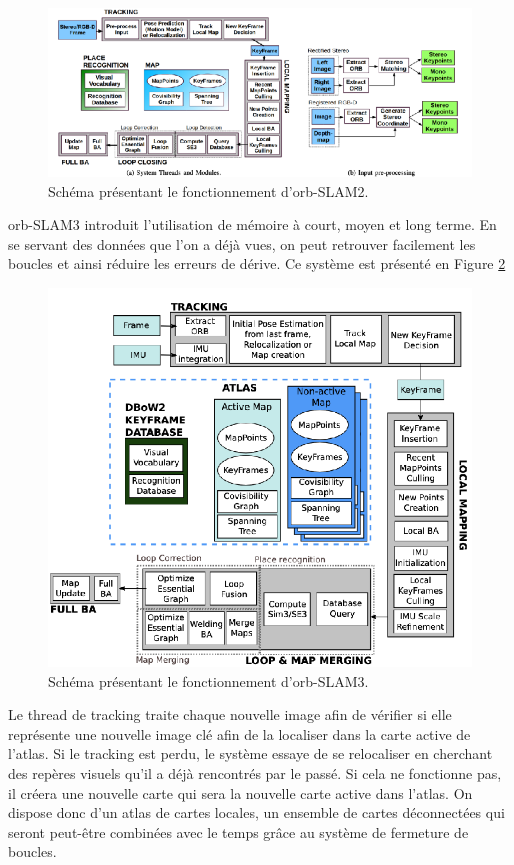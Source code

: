 \documentclass[11pt]{article}
\begin{document}
  \begin{figure}[hbt]  
    \includegraphics[width=\textwidth]{ORB_SLAM2.png}    
    \caption{Schéma présentant le fonctionnement d'\acrshort{orb}-SLAM2.}
    \label{fig:ORBSLAM2}
  \end{figure} 

  \acrshort{orb}-SLAM3 introduit l'utilisation de mémoire à court, moyen et long terme. En se servant des données que l'on a déjà vues, on peut retrouver
  facilement les boucles et ainsi réduire les erreurs de dérive. Ce système est présenté en Figure \ref{fig:ORBSLAM3}

  \begin{figure}[hbt]  
    \includegraphics[width=\textwidth]{ORB_SLAM3.png}    
    \caption{Schéma présentant le fonctionnement d'\acrshort{orb}-SLAM3.}
    \label{fig:ORBSLAM3}
  \end{figure} 

  Le thread de tracking traite chaque nouvelle image afin de vérifier si elle représente une nouvelle image clé afin de la localiser
  dans la carte active de l'atlas. Si le tracking est perdu, le système essaye de se relocaliser en cherchant des repères visuels 
  qu'il a déjà rencontrés par le passé. Si cela ne fonctionne pas, il créera une nouvelle carte qui sera la nouvelle carte active dans l'atlas.
  On dispose donc d'un atlas de cartes locales, un ensemble de cartes déconnectées qui seront peut-être combinées avec le temps grâce au 
  système de fermeture de boucles.
\end{document}
